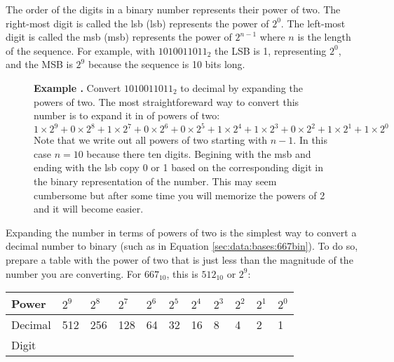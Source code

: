 \documentclass[letterpaper, 12pt]{book}
\newcommand*{\example}[1]{\noindent
    \colorbox{blue!10}{\noindent
        \begin{minipage}{\textwidth}
            \textbf{Example \thechapter.\arabic{examples}}\stepcounter{examples}
            #1
        \end{minipage}
    }
}
\begin{document}
The order of the digits in a binary number represents their power of two. The right-most digit is 
called the \acrlong{lsb} (\acrshort{lsb}) represents the power of $2^0$. The left-most digit is called 
the \acrlong{msb} (\acrshort{msb}) represents the power of $2^{n-1}$ where $n$ is the length of the 
sequence. For example, with $1010011011_2$ the LSB is 1, representing $2^0$, and the MSB is $2^9$ 
because the sequence is 10 bits long. %

\begin{figure}[h!]
    \example{Convert $1010011011_2$ to decimal by expanding the powers of two. The most straightforeward %
    way to convert this number is to expand it in of powers of two:%
    \begin{equation}\label{sec:data:bases:667bin}%
        1 \times 2^9 + 0 \times 2^8 + 1 \times 2^7 + 0 \times 2^6 + 0 \times 2^5 + 1 \times 2^4 
        + 1 \times 2^3 + 0 \times 2^2 + 1 \times 2^1 + 1 \times 2^0
    \end{equation}%
    Note that we write out all powers of two starting with $n-1$. In this case $n=10$ because there %
    ten digits. Begining with the \acrshort{msb} and ending with the \acrshort{lsb} copy 0 or 1 %
    based on the corresponding digit in the binary representation of the number. This may seem cumbersome %
    but after some time you will memorize the powers of 2 and it will become easier.}
\end{figure}


Expanding the number in terms of powers of two is the simplest way to convert a decimal number to binary 
(such as in Equation \ref{sec:data:bases:667bin}). To do so, prepare a table with the power of two that 
is just less than the magnitude of the number you are converting. 
For $667_{10}$, this is $512_{10}$ or $2^9$:

\noindent
\vspace{1em}
\begin{tabular}{|l|l|l|l|l|l|l|l|l|l|l|}\hline
Power & $2^9$ & $2^8$ & $2^7$ & $2^6$ & $2^5$ & $2^4$ & $2^3$ & $2^2$ & $2^1$ & $2^0$ \\\hline\hline
Decimal & 512 & 256 & 128 & 64 & 32 & 16 & 8 & 4 & 2 & 1 \\\hline
Digit &  &  &  &  &  &  &  &  &  &  \\\hline
\end{tabular}
\end{document}
